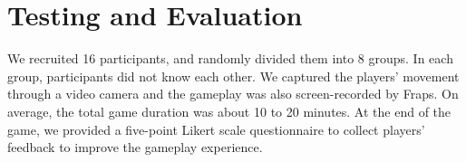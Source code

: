 \documentclass{chi-ext}
\begin{document}
\section{Testing and Evaluation}

We recruited 16 participants, and randomly divided them into 8 groups. In each group, participants did not know each other. We captured the players' movement through a video camera and the gameplay was also screen-recorded by Fraps\cite{Fraps}.
On average, the total game duration was about 10 to 20 minutes. 
At the end of the game, we provided a five-point Likert scale questionnaire to 
collect players' feedback to improve the gameplay experience.

\end{document}

